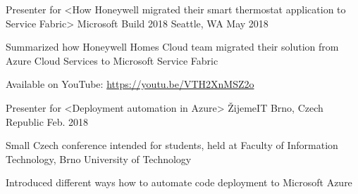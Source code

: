 

\begin{cventries}

  \cventry
    {Presenter for <How Honeywell migrated their smart thermostat application to Service Fabric>} %
    {Microsoft Build 2018} %
    {Seattle, WA} %
    {May 2018} %
    {
      \begin{cvitems} %
        \item {Summarized how Honeywell Homes Cloud team migrated their solution from Azure Cloud Services to Microsoft Service Fabric}
        \item {Available on YouTube: \href{https://youtu.be/VTH2XnMSZ2o}{https://youtu.be/VTH2XnMSZ2o}}
      \end{cvitems}
    }

  \cventry
    {Presenter for <Deployment automation in Azure>} %
    {\v{Z}ijemeIT} %
    {Brno, Czech Republic} %
    {Feb. 2018} %
    {
      \begin{cvitems} %
        \item {Small Czech conference intended for students, held at Faculty of Information Technology, Brno University of Technology}
        \item {Introduced different ways how to automate code deployment to Microsoft Azure}
      \end{cvitems}
    }

\end{cventries}

